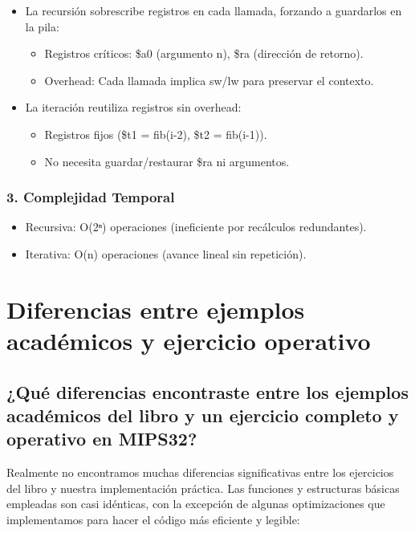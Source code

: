 \documentclass{article}
\begin{document}
\begin{itemize}[leftmargin=*]
    \item La recursión sobrescribe registros en cada llamada, forzando a guardarlos en la pila:
    \begin{itemize}
        \item Registros críticos: \$a0 (argumento n), \$ra (dirección de retorno).
        \item Overhead: Cada llamada implica sw/lw para preservar el contexto.
    \end{itemize}
    
    \item La iteración reutiliza registros sin overhead:
    \begin{itemize}
        \item Registros fijos (\$t1 = fib(i-2), \$t2 = fib(i-1)).
        \item No necesita guardar/restaurar \$ra ni argumentos.
    \end{itemize}
\end{itemize}

\subsubsection*{3. Complejidad Temporal}

\begin{itemize}[leftmargin=*]
    \item Recursiva: O(2ⁿ) operaciones (ineficiente por recálculos redundantes).
    \item Iterativa: O(n) operaciones (avance lineal sin repetición).
\end{itemize}

\section{Diferencias entre ejemplos académicos y ejercicio operativo}

\subsection{¿Qué diferencias encontraste entre los ejemplos académicos del libro y un ejercicio completo y operativo en MIPS32?}

Realmente no encontramos muchas diferencias significativas entre los ejercicios del libro y nuestra implementación práctica. Las funciones y estructuras básicas empleadas son casi idénticas, con la excepción de algunas optimizaciones que implementamos para hacer el código más eficiente y legible:
\end{document}
